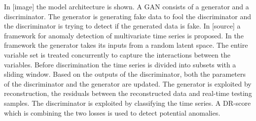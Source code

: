 In [image] the model architecture is shown. A GAN consists of a generator and a discriminator. The generator is generating fake data to fool the discriminator and the discriminator is trying to detect if the generated data is fake. In [source] a framework for anomaly detection of multivariate time series is proposed. In the framework the generator takes its inputs from a random latent space. The entire variable set is treated concurrently to capture the interactions between the variables. Before discrimination the time series is divided into subsets with a sliding window. Based on the outputs of the discriminator, both the parameters of the discriminator and the generator are updated. The generator is exploited by reconstruction, the residuals between the reconstructed data and real-time testing samples. The discriminator is exploited by classifying the time series. A DR-score which is combining the two losses is used to detect potential anomalies.

